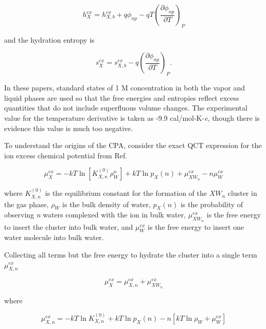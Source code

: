 \begin{cpa}
  \begin{equation}
    h_X^{ex} = h_{X,b}^{ex} + q\phi_{np} - qT\left(\frac{\partial \phi_{np}}{\partial T}\right)_P
    \label{eq:echemh}
  \end{equation}

  \noindent and the hydration entropy\cite{lynden1997hydrophobic} is

  \begin{equation}
    s_X^{ex} = s_{X,b}^{ex} - q\left(\frac{\partial \phi_{np}}{\partial T}\right)_P.
    \label{eq:echems}
  \end{equation}

  \noindent In these papers, standard states of 1 M concentration in both the vapor and liquid phases are used so that the free energies and entropies 
  reflect excess quantities that do not include superfluous volume changes. The experimental value for the temperature derivative is taken as -9.9 
  cal/mol-K-\emph{e}\cite{randles1977structure}, though there is evidence this value is much too negative\cite{donald2010expand_cpa,vlcek2013cpa}.

  To understand the origins of the CPA, consider the exact QCT expression for the ion excess chemical potential from Ref. \cite{asthagiri2010ion}
  
  \begin{equation}
    \mu_X^{ex} = -kT \ln [K_{X,n}^{(0)} \rho_W^n] + kT \ln p_X(n) + \mu^{ex}_{XW_n} - n\mu^{ex}_W  
    \label{eq:qctcpl}
  \end{equation}

  \noindent where $K_{X,n}^{(0)}$ is the equilibrium constant for the formation of the $XW_n$ cluster in the gas phase, $\rho_W$ is the bulk density of 
  water, $p_X(n)$ is the probability of observing \emph{n} waters complexed with the ion in bulk water, $\mu^{ex}_{XW_n}$ is the free energy to insert the 
  cluster into bulk water, and $\mu^{ex}_W$ is the free energy to insert one water molecule into bulk water.

  Collecting all terms but the free energy to hydrate the cluster into a single term $\mu^{ex}_{X,n}$
  
  \begin{equation}
    \mu_X^{ex} =  \mu^{ex}_{X,n} + \mu^{ex}_{XW_n}  
    \label{eq:qctcpa}
  \end{equation}

  \noindent where
  
  \begin{equation}
    \mu^{ex}_{X,n} = -kT \ln K_{X,n}^{(0)} + kT \ln p_X(n) - n \left[ kT \ln \rho_W  + \mu^{ex}_W \right] 
    \label{eq:qctcpaxn}
  \end{equation}


\end{cpa}
